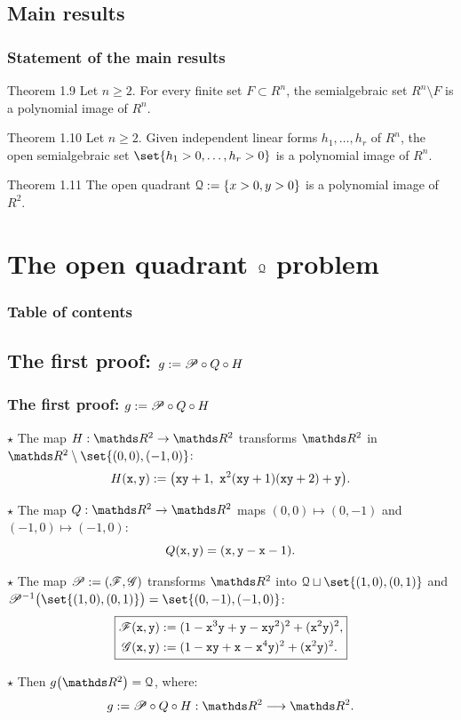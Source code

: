 \documentclass{beamer}
\begin{document}
\subsection{Main results}
\begin{frame}
\frametitle{Statement of the main results}

\begin{block}{Theorem 1.9}
Let $n\ge2$. For every finite set $F\subset R^n$, the semialgebraic set $R^n\setminus F$ is a polynomial image of $R^n$.
\end{block} 
\vspace{0.4cm}

\begin{block}{Theorem 1.10}
Let $n\ge 2$. Given independent linear forms $h_1,\dots,h_r$ of $R^n$, the open semialgebraic set $\set{h_1>0,\dots,h_r>0}$ is a polynomial image of $R^n$.
\end{block} 
\vspace{0.4cm}

\begin{block}{Theorem 1.11}
The open quadrant $\Qu:=\{x>0,y>0\}$ is a polynomial image of $R^2$.
\end{block}
\end{frame}

\section{The open quadrant $\Qu$ problem}
\begin{frame}
\frametitle{Table of contents}
\tableofcontents[currentsection]
\end{frame} 

\subsection{The first proof: $g:=\P\circ Q\circ H$}
\begin{frame}
\frametitle{The first proof: $g:=\P\circ Q\circ H$} 
$\star$ The map $H:\R^2\to\R^2$ transforms $\R^2$ in $\R^2\setminus \set{(0,0),(-1,0)}$:
$$
H(\x,\y) := \big(\x\y+1,\ \x^2(\x\y+1)(\x\y+2)+\y\big).
$$	
 

$\star$ The map $Q:\R^2\to\R^2$ maps $(0,0) \mapsto (0,-1)$ and $(-1,0) \mapsto (-1,0)$: 
$$
Q(\x,\y)= (\x,\y-\x-1).
$$
 

$\star$ The map $\P := (\F, \G)$ transforms $\R^2$ into $\Qu \sqcup \set{(1,0),(0,1)}$ and $\P^{-1}\big(\set{(1,0),(0,1)}\big) = \set{(0,-1),(-1,0)}$:
\begin{equation*}\label{eq:firstMap}
\boxed{
\begin{aligned}
\F({\tt x},{\tt y})&:=(1-{\tt x}^3{\tt y}+{\tt y}-{\tt x}{\tt y}^2)^2+({\tt x}^2{\tt y})^2, \\
\G({\tt x},{\tt y})&:=(1-{\tt x}{\tt y}+{\tt x}-{\tt x}^4{\tt y})^2+({\tt x}^2{\tt y})^2. \\
\end{aligned}
}
\end{equation*}
 

$\star$ Then $g\big(\R^2\big) = \Qu$, where:
$$
g:=\P\circ Q\circ H:\R^2\longrightarrow\R^2.
$$
\end{frame}
\end{document}
